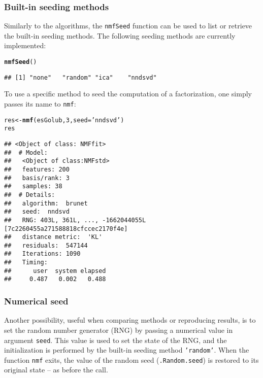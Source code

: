 \documentclass[a4paper]{article}\usepackage[]{graphicx}\usepackage[]{color}
\makeatletter
\newcommand{\hlnum}[1]{\textcolor[rgb]{0.686,0.059,0.569}{#1}}%
\newcommand{\hlstr}[1]{\textcolor[rgb]{0.192,0.494,0.8}{#1}}%
\newcommand{\hlstd}[1]{\textcolor[rgb]{0.345,0.345,0.345}{#1}}%
\newcommand{\hlkwb}[1]{\textcolor[rgb]{0.69,0.353,0.396}{#1}}%
\newcommand{\hlkwc}[1]{\textcolor[rgb]{0.333,0.667,0.333}{#1}}%
\newcommand{\hlkwd}[1]{\textcolor[rgb]{0.737,0.353,0.396}{\textbf{#1}}}%
\newenvironment{kframe}{%
 \def\at@end@of@kframe{}%
 \ifinner\ifhmode%
  \def\at@end@of@kframe{\end{minipage}}%
  \begin{minipage}{\columnwidth}%
 \fi\fi%
 \def\FrameCommand##1{\hskip\@totalleftmargin \hskip-\fboxsep
 \colorbox{shadecolor}{##1}\hskip-\fboxsep
     \hskip-\linewidth \hskip-\@totalleftmargin \hskip\columnwidth}%
 \MakeFramed {\advance\hsize-\width
   \@totalleftmargin\z@ \linewidth\hsize
   \@setminipage}}%
 {\par\unskip\endMakeFramed%
 \at@end@of@kframe}
\newenvironment{knitrout}{}{} %
\let\code=\texttt
\makeatother
\begin{document}
\subsubsection{Built-in seeding methods}
Similarly to the algorithms, the \code{nmfSeed} function can be used to list or retrieve the built-in seeding methods.
The following seeding methods are currently implemented:

\begin{knitrout}
\color{fgcolor}\begin{kframe}
\begin{alltt}
\hlkwd{nmfSeed}\hlstd{()}
\end{alltt}
\begin{verbatim}
## [1] "none"   "random" "ica"    "nndsvd"
\end{verbatim}
\end{kframe}
\end{knitrout}

To use a specific method to seed the computation of a factorization, one simply passes its name to \code{nmf}:

\begin{knitrout}
\color{fgcolor}\begin{kframe}
\begin{alltt}
\hlstd{res} \hlkwb{<-} \hlkwd{nmf}\hlstd{(esGolub,} \hlnum{3}\hlstd{,} \hlkwc{seed}\hlstd{=}\hlstr{'nndsvd'}\hlstd{)}
\hlstd{res}
\end{alltt}
\begin{verbatim}
## <Object of class: NMFfit>
##  # Model:
##   <Object of class:NMFstd>
##   features: 200 
##   basis/rank: 3 
##   samples: 38 
##  # Details:
##   algorithm:  brunet 
##   seed:  nndsvd 
##   RNG: 403L, 361L, ..., -1662044055L [7c2260455a271588818cfccec2170f4e]
##   distance metric:  'KL' 
##   residuals:  547144 
##   Iterations: 1090 
##   Timing:
##      user  system elapsed 
##     0.487   0.002   0.488
\end{verbatim}
\end{kframe}
\end{knitrout}

\subsubsection{Numerical seed}\label{sec:numseed}
Another possibility, useful when comparing methods or reproducing results, is to set the random number generator (RNG) by passing a numerical value in argument \code{seed}.
This value is used to set the state of the RNG, and the initialization is performed by the built-in seeding method \code{'random'}.
When the function \code{nmf} exits, the value of the random seed (\code{.Random.seed}) is restored to its original state -- as before the call.
\end{document}

